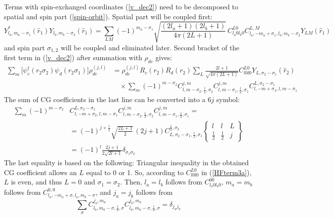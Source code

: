 \documentclass[10pt,a4paper]{article}
\begin{document}
Terms with spin-exchanged coordinates (\ref{v_dec2}) need to be decomposed to spatial and spin part (\ref{spin-orbit}). Spatial part will be coupled first:
\begin{equation}
Y_{l_a,m_a-\sigma_1}^*(\hat{r}_1) Y_{l_b,m_b-\sigma_2}(\hat{r}_1) =
\sum_{LM} (-1)^{m_a-\sigma_1}
\sqrt{\frac{(2l_a+1)(2l_b+1)}{4\pi(2L+1)}}\,C_{l_a 0 l_b 0}^{L 0}
C_{l_a,-m_a+\sigma_1,l_b,m_b-\sigma_2}^{L,M}
Y_{LM}(\hat{r}_1)
\tag{V.~5.6.9}
\end{equation}
and spin part $\sigma_{1,2}$ will be coupled and eliminated later. Second bracket of the first term in (\ref{v_dec2}) after summation with $\rho_{dc}$ gives:
\begin{align}
\sum_m \big[\psi_c^\dagger(r_2\sigma_2)\psi_d(r_2\sigma_1)\big]\rho_{dc}^{(j,l)} &=
\rho_{dc}^{(j,l)} R_c(r_2)R_d(r_2)\sum_L \frac{2l+1}{\sqrt{4\pi(2L+1)}}
C_{l0l0}^{L0} Y_{L,\sigma_2-\sigma_1}(\hat{r}_2) \nonumber\\
\label{HFterm3a}
&\quad\times \sum_m (-1)^{m-\sigma_2} C_{l,m-\sigma_2,\frac{1}{2},\sigma_2}^{j,m}
C_{l,m-\sigma_1,\frac{1}{2},\sigma_1}^{j,m}
C_{l,-m+\sigma_2,l,m-\sigma_1}^{L,\sigma_2-\sigma_1}
\end{align}
The sum of CG coefficients in the last line can be converted into a $6j$ symbol:
\begin{align}
\sum_m (-1)^{m-\sigma_2} &C_{l,-m+\sigma_2,l,m-\sigma_1}^{L,\sigma_2-\sigma_1}
C_{l,m-\sigma_2,\frac{1}{2},\sigma_2}^{j,m}
C_{l,m-\sigma_1,\frac{1}{2},\sigma_1}^{j,m} = \nonumber\\
&=(-1)^{j+\frac{1}{2}} \sqrt{\frac{2L+1}{2}}\,(2j+1)
C_{L,\sigma_2-\sigma_1,\frac{1}{2},\sigma_1}^{\frac{1}{2},\sigma_2}
\begin{Bmatrix} l & l & L \\ \frac{1}{2} & \frac{1}{2} & j \end{Bmatrix}
\tag{V.~8.7.16} \\
&= (-1)^{l}\frac{2j+1}{2\sqrt{2l+1}}\delta_{\sigma_1\sigma_2}
\end{align}
The last equality is based on the following: Triangular inequality in the obtained CG coefficient allows an $L$ equal to 0 or 1. So, according to $C_{l0l0}^{L0}$ in (\ref{HFterm3a}), $L$ is even, and thus $L=0$ and $\sigma_1 = \sigma_2$. Then, $l_a = l_b$ follows from $C_{l_a 0 l_b 0}^{00}$, $m_a = m_b$ follows from $C_{l_a,-m_a+\sigma,l_a,m_b-\sigma}^{0,0}$, and $j_a = j_b$ follows from
\begin{equation}
\sum_{\sigma} C_{l_a,m_a-\sigma,\frac{1}{2},\sigma}^{j_a,m_a}
C_{l_a,m_a-\sigma,\frac{1}{2},\sigma}^{j_b,m_a} = \delta_{j_a j_b}
\tag{V.~8.7.4}
\end{equation}
\end{document}
